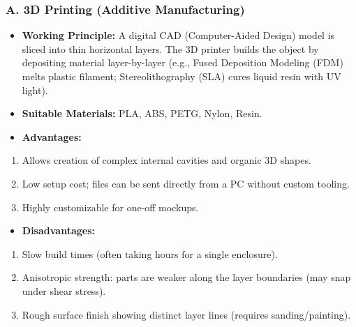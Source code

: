 \subsubsection{A. 3D Printing (Additive Manufacturing)}
\begin{itemize}
  \item   \textbf{Working Principle:} A digital CAD (Computer-Aided Design) model is sliced into thin horizontal layers. The 3D printer builds the object by depositing material layer-by-layer (e.g., Fused Deposition Modeling (FDM) melts plastic filament; Stereolithography (SLA) cures liquid resin with UV light).
  \item   \textbf{Suitable Materials:} PLA, ABS, PETG, Nylon, Resin.
  \item   \textbf{Advantages:}
\end{itemize}
\begin{enumerate}
  \item Allows creation of complex internal cavities and organic 3D shapes.
  \item Low setup cost; files can be sent directly from a PC without custom tooling.
  \item Highly customizable for one-off mockups.
\end{enumerate}
\begin{itemize}
  \item   \textbf{Disadvantages:}
\end{itemize}
\begin{enumerate}
  \item Slow build times (often taking hours for a single enclosure).
  \item Anisotropic strength: parts are weaker along the layer boundaries (may snap under shear stress).
  \item Rough surface finish showing distinct layer lines (requires sanding/painting).
\end{enumerate}

